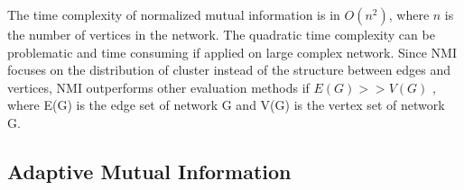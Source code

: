 \documentclass[12pt]{article}
\begin{document}
\bigbreak

The time complexity of normalized mutual information is in $O(n^2)$, where $n$ is the number of vertices in the network. The quadratic time complexity can be problematic and time consuming if applied on large complex network. Since NMI focuses on the distribution of cluster instead of the structure between edges and vertices, NMI outperforms other evaluation methods if $E(G) >>V(G)$
, where E(G) is the edge set of network G and V(G) is the vertex set of network G.

\subsection{Adaptive Mutual Information}

\end{document}
